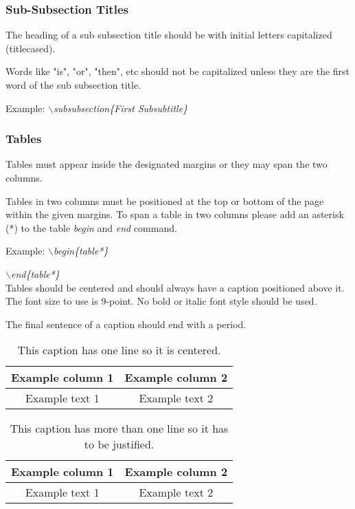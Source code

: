 \documentclass[a4paper,twoside]{article}
\begin{document}
\subsubsection{Sub-Subsection Titles}

The heading of a sub subsection title should be with initial letters
capitalized (titlecased).

Words like "is", "or", "then", etc should not be capitalized unless
they are the first word of the sub subsection title.

Example: \textit{$\backslash$subsubsection\{First Subsubtitle\}}

\subsubsection{Tables}

Tables must appear inside the designated margins or they may span
the two columns.

Tables in two columns must be positioned at the top or bottom of the
page within the given margins. To span a table in two columns please add an asterisk (*) to the table \textit{begin} and \textit{end} command.

Example: \textit{$\backslash$begin\{table*\}}

\hspace*{1.5cm}\textit{$\backslash$end\{table*\}}\\

Tables should be centered and should always have a caption
positioned above it. The font size to use is 9-point. No bold or
italic font style should be used.

The final sentence of a caption should end with a period.

\begin{table}[h]
\caption{This caption has one line so it is
centered.}\label{tab:example1} \centering
\begin{tabular}{|c|c|}
  \hline
  Example column 1 & Example column 2 \\
  \hline
  Example text 1 & Example text 2 \\
  \hline
\end{tabular}
\end{table}

\begin{table}[h]
\caption{This caption has more than one line so it has to be
justified.}\label{tab:example2} \centering
\begin{tabular}{|c|c|}
  \hline
  Example column 1 & Example column 2 \\
  \hline
  Example text 1 & Example text 2 \\
  \hline
\end{tabular}
\end{table}
\end{document}
